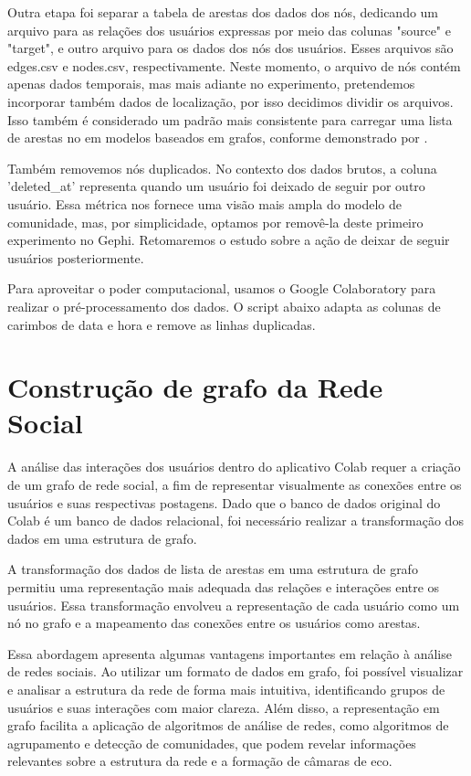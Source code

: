 Outra etapa foi separar a tabela de arestas dos dados dos nós, dedicando um arquivo para as relações dos usuários expressas por meio das colunas "source" e "target", e outro arquivo para os dados dos nós dos usuários. Esses arquivos são edges.csv e nodes.csv, respectivamente. Neste momento, o arquivo de nós contém apenas dados temporais, mas mais adiante no experimento, pretendemos incorporar também dados de localização, por isso decidimos dividir os arquivos. Isso também é considerado um padrão mais consistente para carregar uma lista de arestas no em modelos baseados em grafos, conforme demonstrado por .

Também removemos nós duplicados. No contexto dos dados brutos, a coluna 'deleted\_at' representa quando um usuário foi deixado de seguir por outro usuário. Essa métrica nos fornece uma visão mais ampla do modelo de comunidade, mas, por simplicidade, optamos por removê-la deste primeiro experimento no Gephi. Retomaremos o estudo sobre a ação de deixar de seguir usuários posteriormente.

Para aproveitar o poder computacional, usamos o Google Colaboratory para realizar o pré-processamento dos dados. O script abaixo adapta as colunas de carimbos de data e hora e remove as linhas duplicadas.

\section{Construção de grafo da Rede Social}
A análise das interações dos usuários dentro do aplicativo Colab requer a criação de um grafo de rede social, a fim de representar visualmente as conexões entre os usuários e suas respectivas postagens. Dado que o banco de dados original do Colab é um banco de dados relacional, foi necessário realizar a transformação dos dados em uma estrutura de grafo.

A transformação dos dados de lista de arestas em uma estrutura de grafo permitiu uma representação mais adequada das relações e interações entre os usuários. Essa transformação envolveu a representação de cada usuário como um nó no grafo e a mapeamento das conexões entre os usuários como arestas.

Essa abordagem apresenta algumas vantagens importantes em relação à análise de redes sociais. Ao utilizar um formato de dados em grafo, foi possível visualizar e analisar a estrutura da rede de forma mais intuitiva, identificando grupos de usuários e suas interações com maior clareza. Além disso, a representação em grafo facilita a aplicação de algoritmos de análise de redes, como algoritmos de agrupamento e detecção de comunidades, que podem revelar informações relevantes sobre a estrutura da rede e a formação de câmaras de eco.

